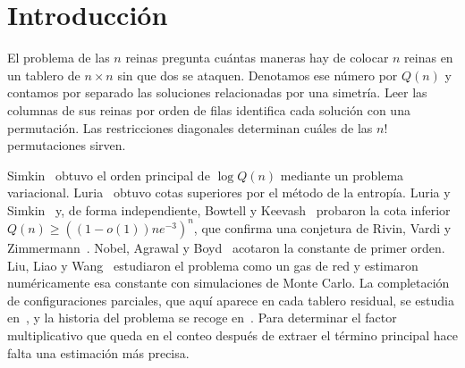 \section{Introducción}
El problema de las $n$ reinas pregunta cuántas maneras hay de colocar $n$ reinas en un
tablero de $n\times n$ sin que dos se ataquen. Denotamos ese número por $Q(n)$ y contamos
por separado las soluciones relacionadas por una simetría. Leer las columnas de sus reinas
por orden de filas identifica cada solución con una permutación. Las restricciones diagonales
determinan cuáles de las $n!$ permutaciones sirven.

Simkin~\cite[Teorema~1.1]{simkin} obtuvo el orden principal de $\log Q(n)$ mediante
un problema variacional. Luria~\cite{luria} obtuvo cotas superiores por el método de la entropía.
Luria y Simkin~\cite{ls} y, de forma independiente, Bowtell y Keevash~\cite{bk} probaron la cota
inferior $Q(n)\ge((1-o(1))ne^{-3})^n$, que confirma una conjetura de Rivin, Vardi y
Zimmermann~\cite{rvz}. Nobel, Agrawal y Boyd~\cite{nab} acotaron la constante de primer orden.
Liu, Liao y Wang~\cite{llw} estudiaron el problema como un gas de red y estimaron numéricamente
esa constante con simulaciones de Monte Carlo. La
completación de configuraciones parciales, que aquí aparece en cada tablero residual, se estudia
en~\cite{gms}, y la historia del problema se recoge en~\cite{bs}. Para determinar el factor
multiplicativo que queda en el conteo después de extraer el término principal hace falta una
estimación más precisa.


